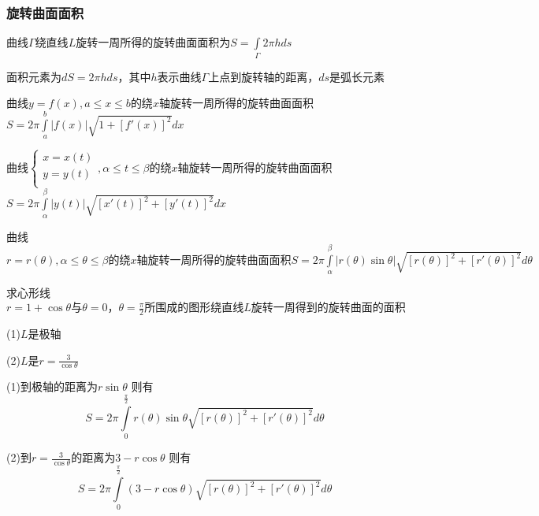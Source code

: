 \documentclass[lang=cn,10pt]{elegantbook}
\begin{document}
\subsubsection{旋转曲面面积}
曲线$\varGamma \text{绕直线}L\text{旋转一周所得的旋转曲面面积为}S=\int\limits_{\varGamma}{2\pi hds}$

面积元素为$dS=2\pi hds$，其中$h$表示曲线$\varGamma $上点到旋转轴的距离，$ds$是弧长元素
\begin{conclusion}
	曲线$y=f(x),a\le x\le b $的绕$x$轴旋转一周所得的旋转曲面面积$S=2\pi \int\limits_a^b{|f\left( x \right) |}\sqrt{1+\left[ f\prime\left( x \right) \right] ^2}dx$
	
	曲线$\begin{cases}
		x=x\left( t \right)\\
		y=y\left( t \right)\\
	\end{cases},\alpha \le t\le \beta$的绕$x$轴旋转一周所得的旋转曲面面积$S=2\pi \int\limits_{\alpha}^{\beta}{|y\left( t \right) |\sqrt{\left[ x\prime\left( t \right) \right] ^2+\left[ y\prime\left( t \right) \right] ^2}dx}
	$
	
	曲线$r=r\left( \theta \right) ,\alpha \le \theta \le \beta \text{的绕$x$轴旋转一周所得的旋转曲面面积}S=2\pi \int\limits_{\alpha}^{\beta}{|r\left( \theta \right) \sin \theta |\sqrt{\left[ r\left( \theta \right) \right] ^2+\left[ r\prime\left( \theta \right) \right] ^2}d\theta}
	$
\end{conclusion}
\begin{example}
	求心形线$r=1+\cos \theta \text{与}\theta =0\text{，}\theta =\frac{\pi}{2}\text{所围成的图形绕直线}L\text{旋转一周得到的旋转曲面的面积}
	$
	
	(1)$L$是极轴
	
	(2)$L$是$r=\frac{3}{\cos \theta}$
\end{example}
\begin{solution}
	
	(1)到极轴的距离为$r\sin \theta$
	则有
	\begin{equation*}
		S=2\pi \int\limits_0^{\frac{\pi}{2}}{r\left( \theta \right) \sin \theta \sqrt{\left[ r\left( \theta \right) \right] ^2+\left[ r\prime\left( \theta \right) \right] ^2}d\theta}
	\end{equation*}
	
	(2)到$r=\frac{3}{\cos \theta}$的距离为$3-r\cos \theta$
	则有
	\begin{equation*}
		S=2\pi \int\limits_0^{\frac{\pi}{2}}{\left( 3-r\cos \theta \right) \sqrt{\left[ r\left( \theta \right) \right] ^2+\left[ r\prime\left( \theta \right) \right] ^2}d\theta}
	\end{equation*}
\end{solution}
\end{document}
